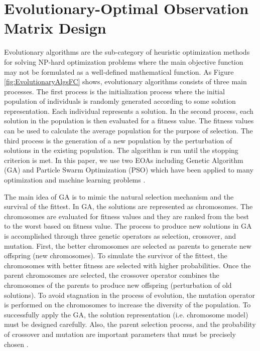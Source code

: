 \section{Evolutionary-Optimal Observation Matrix Design}  \label{sec:SNIPEREvlObsMtxDsg}
Evolutionary algorithms are the sub-category of heuristic optimization methods \cite{Talib:2009} for solving NP-hard optimization problems where the main objective function may not be formulated as a well-defined mathematical function. As Figure \ref{fig:EvolutionaryAlgsFC} shows, evolutionary algorithms consists of three main processes. The first process is the initialization process where the initial population of individuals is randomly generated according to some solution representation. Each individual represents a solution. In the second process, each solution in the population is then evaluated for a fitness value. The fitness values can be used to calculate the average population for the purpose of selection. The third process is the generation of a new population by the perturbation of solutions in the existing population. The algorithm is run until the stopping criterion is met. In this paper, we use two EOAs including Genetic Algorithm (GA) and Particle Swarm Optimization (PSO) which have been applied to many optimization and machine learning problems \cite{Talib:2009}\cite{Kachitvichyanuku:2012}.

The main idea of GA is to mimic the natural selection mechanism and the survival of the fittest. In GA, the solutions are represented as chromosomes. The chromosomes are evaluated for fitness values and they are ranked from the best to the worst based on fitness value. The process to produce new solutions in GA is accomplished through three genetic operators as selection, crossover, and mutation. First, the better chromosomes are selected as parents to generate new offspring (new chromosomes). To simulate the survivor of the fittest, the chromosomes with better fitness are selected with higher probabilities. Once the parent chromosomes are selected, the crossover operator combines the chromosomes of the parents to produce new offspring (perturbation of old solutions). To avoid stagnation in the process of evolution, the mutation operator is performed on the chromosomes to increase the diversity of the population. To successfully apply the GA, the solution representation (i.e. chromosome model) must be designed carefully. Also, the parent selection process, and the probability of crossover and mutation are important parameters that must be precisely chosen \cite{Kachitvichyanuku:2012}.

